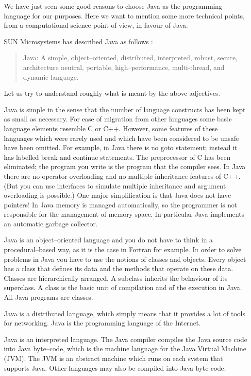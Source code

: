 We have just seen some good reasons to choose Java as the programming language
for our purposes. Here we want to mention some more technical points, from a 
computational science point of view, in favour of Java.

SUN Microsystems has described Java as follows \cite[]{javanutshell}:
\begin{quote}
Java: A simple, object--oriented, distributed, interpreted, robust, secure,
architecture neutral, portable, high--performance, multi-thread, and dynamic 
language.
\end{quote}
Let us try to understand roughly what is meant by the above adjectives.

Java is simple in the sense that the number of language constructs has been 
kept as small as necessary. For ease of migration from other languages some
basic language elements resemble C or C++. However, some features of these 
languages which were rarely used and which have been considered to be unsafe 
have been omitted. For example, in Java there is no goto statement; instead 
it has labelled break and continue statements. The preprocessor of C has been 
eliminated; the program you write is the program that the compiler sees. In 
Java there are no  operator overloading and no multiple inheritance 
features of C++. (But you can use interfaces to simulate multiple inheritance
and argument overloading is possible.)
One major simplification is that Java does not have pointers!
In Java memory is managed automatically, so the programmer is not responsible 
for the management  of memory space. In particular Java implements an 
automatic  garbage collector.

Java is an object--oriented language and you do not have to think in a 
procedural--based way, as it is the case in Fortran for example. In order to 
solve problems in Java you have to use the notions of classes and objects. 
Every object has a class that defines its data and the methods that operate 
on these data. Classes are hierarchically arranged. A subclass inherits the 
behaviour of its superclass. A class is the basic unit of compilation
and of the execution in Java. All Java programs are classes.

Java is a distributed language, which simply means that it provides a lot of 
tools for networking. Java is the programming language of the Internet.

Java is an interpreted language. The Java compiler compiles the Java
source code into Java byte--code, which is the machine language for the Java
Virtual Machine (JVM). The JVM is an abstract machine which runs on each system
that supports Java. Other languages may also be compiled into Java byte-code.

